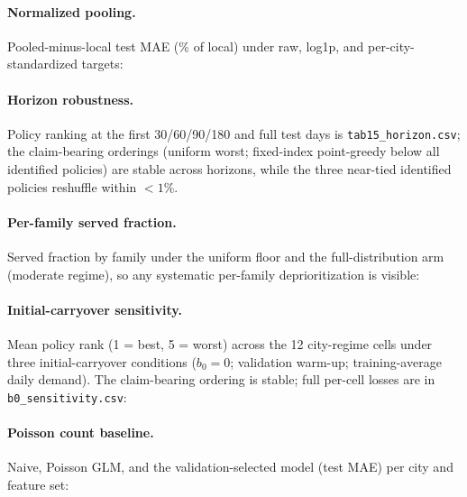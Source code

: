 \noindent\resizebox{\linewidth}{!}{}

\paragraph{Normalized pooling.} Pooled-minus-local test MAE (\% of local)
under raw, log1p, and per-city-standardized targets:

\noindent\resizebox{\linewidth}{!}{}

\paragraph{Horizon robustness.} Policy ranking at the first
30/60/90/180 and full test days is \texttt{tab15\_horizon.csv}; the
claim-bearing orderings (uniform worst; fixed-index point-greedy below all
identified policies) are stable across horizons, while the three near-tied
identified policies reshuffle within $<1\%$.

\paragraph{Per-family served fraction.} Served fraction by family under
the uniform floor and the full-distribution arm (moderate regime), so any
systematic per-family deprioritization is visible:

{\footnotesize}

\paragraph{Initial-carryover sensitivity.} Mean policy rank (1 = best,
5 = worst) across the 12 city-regime cells under three initial-carryover
conditions ($b_0=0$; validation warm-up; training-average daily demand).
The claim-bearing ordering is stable; full per-cell losses are in
\texttt{b0\_sensitivity.csv}:

{\footnotesize}

\paragraph{Poisson count baseline.} Naive, Poisson GLM, and the
validation-selected model (test MAE) per city and feature set:

{\footnotesize}

